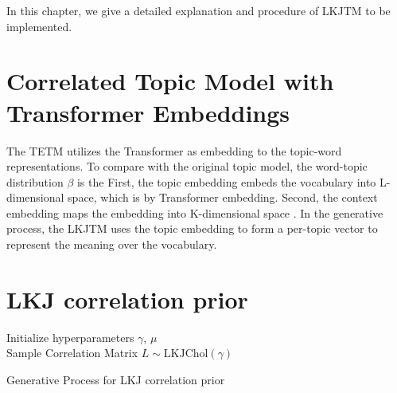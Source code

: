 In this chapter, we give a detailed explanation and procedure of LKJTM to be implemented.
\section{Correlated Topic Model with Transformer Embeddings}
The TETM utilizes the Transformer as embedding to the topic-word representations. To compare with the original topic model, the word-topic distribution $ \beta $ is the 
First, the topic embedding embeds the vocabulary into L-dimensional space, which is by Transformer embedding. Second, the context embedding maps the embedding into K-dimensional space . 
In the generative process, the LKJTM uses the topic embedding to form a per-topic vector to represent the meaning over the vocabulary. 
\section{LKJ correlation prior}
\begin{algorithm}[H]
Initialize hyperparameters $ \gamma $, $ \mu $\\
Sample Correlation Matrix $ L\sim \text{LKJChol}(\gamma)$\\
\caption{Generative Process for LKJ correlation prior}
\label{algorithm:lkjtm}
\end{algorithm}
